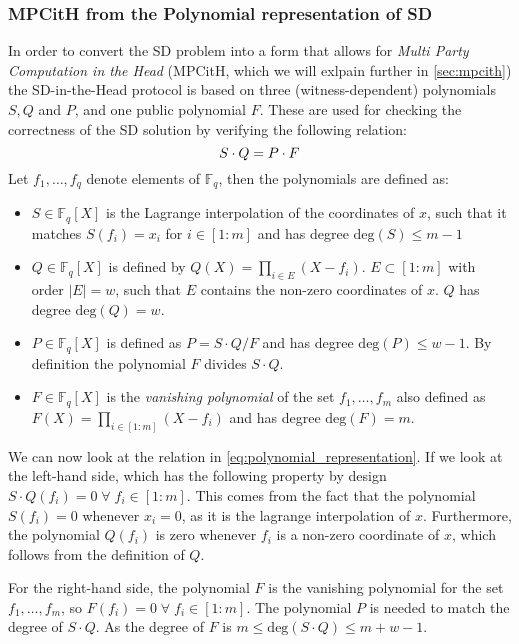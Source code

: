 \documentclass[twoside,11pt,openright]{report}
\theoremstyle{definition}
\theoremstyle{plain}
\begin{document}
\subsubsection{MPCitH from the Polynomial representation of SD}\label{sec:polynomial_representation}
In order to convert the SD problem into a form that allows for \textit{Multi Party Computation in the Head} (MPCitH, which we will exlpain further in \autoref{sec:mpcith}) the SD-in-the-Head protocol is based on three (witness-dependent) polynomials $S, Q$ and $P$, and one public polynomial $F$.
These are used for checking the correctness of the SD solution by verifying the following relation:
\begin{equation}
  \centering
  S\cdot Q = P\cdot F
  \label{eq:polynomial_representation}
\end{equation}
Let $f_1,\dots, f_q$ denote elements of $\mathbb{F}_q$, then the polynomials are defined as:
\begin{itemize}
  \item $S\in \mathbb{F}_q[X]$ is the Lagrange interpolation of the coordinates of $x$, such that it matches $S(f_i) = x_i$ for $i\in [1:m]$ and has degree $\text{deg}(S) \leq m-1$
  \item $Q\in \mathbb{F}_q[X]$ is defined by $Q(X) = \prod_{i\in E}(X - f_i)$. $E \subset [1:m]$ with order $|E| = w$, such that $E$ contains the non-zero coordinates of $x$. $Q$ has degree $\text{deg}(Q) = w$.
  \item $P\in \mathbb{F}_q[X]$ is defined as $P = S\cdot Q/F$ and has degree $\text{deg}(P) \leq w-1$. By definition the polynomial $F$ divides $S\cdot Q$.
  \item $F\in \mathbb{F}_q[X]$ is the \textit{vanishing polynomial} of the set ${f_1, \dots, f_m}$ also defined as $F(X) = \prod_{i\in [1:m]}(X - f_i)$ and has degree $\text{deg}(F) = m$.
\end{itemize}
We can now look at the relation in \autoref{eq:polynomial_representation}. If we look at the left-hand side, which has the following property by design $S\cdot Q(f_i) = 0 \;\forall\; f_i \in [1:m]$. This comes from the fact that the polynomial $S(f_i) = 0$ whenever $x_i = 0$, as it is the lagrange interpolation of $x$. Furthermore, the polynomial $Q(f_i)$ is zero whenever $f_i$ is a non-zero coordinate of $x$, which follows from the definition of $Q$.


For the right-hand side, the polynomial $F$ is the vanishing polynomial for the set ${f_1, \dots, f_m}$, so $F(f_i) = 0 \;\forall\; f_i \in [1:m]$. The polynomial $P$ is needed to match the degree of $S \cdot Q$. As the degree of $F$ is $m \leq \text{deg}(S\cdot Q) \leq m + w - 1$.
\end{document}
